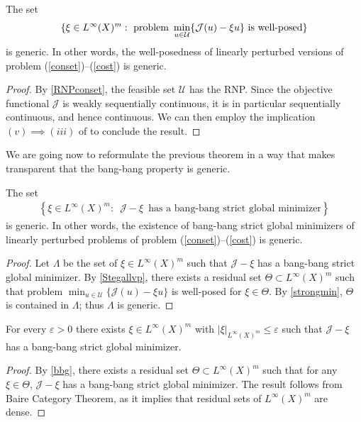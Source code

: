 \documentclass[hidelinks,onefignum,onetabnum]{siamart220329}
\begin{document}
\begin{theorem}\label{Stegallvp}
	The set 
	\begin{align*}
		\{\xi\in {L^\infty(X)^m}:\,\, \text{problem\, $\min_{u\in\mathcal U}\{\mathcal J(u)-\xi u\}$ is well-posed}\}
	\end{align*}
	is generic. In other words, the well-posedness of linearly perturbed versions  of problem (\ref{conset})--(\ref{cost}) is generic.
\end{theorem}
\begin{proof}
	By \cref{RNPconset}, the feasible set $\mathcal U$ has the RNP. Since the objective functional $\mathcal J$ is weakly sequentially continuous, it is in particular sequentially  continuous, and hence continuous. We can then employ  the implication $(v)\implies (iii)$ of \cite[Theorem 5]{Lassonde} to conclude the result.
\end{proof}

We are going now to reformulate the previous theorem in a way that makes transparent that the bang-bang property is generic. 

\begin{theorem}\label{bbg}
	The set
	\begin{align*}
	\left\lbrace \xi\in {L^\infty(X)^m}:\,\,\,	\mathcal J-\xi \,\,\,\text{has a bang-bang strict global minimizer}\right\rbrace 
	\end{align*}
	 is generic. In other words, the existence of bang-bang strict global minimizers of  linearly perturbed problems of problem (\ref{conset})--(\ref{cost}) is generic.
\end{theorem}
\begin{proof}
	Let $\Lambda$ be the set of $\xi\in {L^\infty(X)^m}$ such that $\mathcal J-\xi$ has a bang-bang strict global minimizer.
	By  \cref{Stegallvp}, there exists a residual set $\Theta\subset {L^\infty(X)^m}$ such that
	problem $\min_{u\in\mathcal U}\{\mathcal J(u)-\xi u\}$ is well-posed for $\xi\in\Theta$. 
	By \cref{strongmin}, $\Theta$ is contained in $\Lambda$; thus $\Lambda$ is generic.
\end{proof}
\begin{corollary}\label{bbSteg}
	For every $\varepsilon>0$ there exists $\xi\in L^\infty(X)^m$  with $ |\xi|_{{L^\infty(X)^m}}\le\varepsilon$ such that $\mathcal J-\xi$ has a bang-bang strict global minimizer.
\end{corollary}
\begin{proof}
	By \cref{bbg}, there exists a residual set $\Theta\subset {L^\infty(X)^m}$ such that for any $\xi\in\Theta$, $\mathcal J-\xi$ has a bang-bang strict global minimizer. The result follows from  Baire Category Theorem, as it implies that  residual sets of ${L^\infty(X)^m}$ are dense.
\end{proof}
\end{document}
